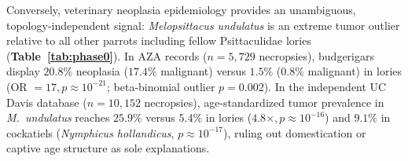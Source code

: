 \documentclass[10pt,a4paper,twocolumn]{article}
\begin{document}
Conversely, veterinary neoplasia epidemiology provides an unambiguous, topology-independent signal: \textit{Melopsittacus undulatus} is an extreme tumor outlier relative to all other parrots including fellow Psittaculidae lories (\textbf{Table~\ref{tab:phase0}}). In AZA records ($n = 5,729$ necropsies), budgerigars display $20.8\%$ neoplasia ($17.4\%$ malignant) versus $1.5\%$ ($0.8\%$ malignant) in lories (OR $= 17, p \approx 10^{-21}$; beta-binomial outlier $p = 0.002$). In the independent UC Davis database ($n = 10,152$ necropsies), age-standardized tumor prevalence in \textit{M.\ undulatus} reaches $25.9\%$ versus $5.4\%$ in lories ($4.8\times, p \approx 10^{-16}$) and $9.1\%$ in cockatiels (\textit{Nymphicus hollandicus}, $p \approx 10^{-17}$), ruling out domestication or captive age structure as sole explanations.

\begin{table}[h]
\centering
\caption{Phase 0/0b macroevolutionary allometry, topology sensitivity, and veterinary necropsy epidemiology.}
\label{tab:phase0}
\end{table}
\end{document}
